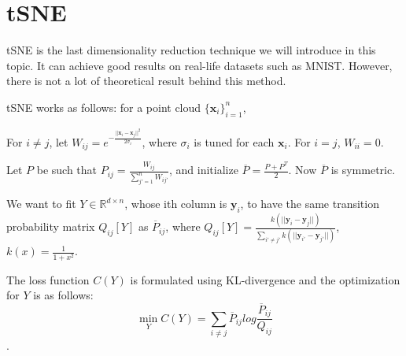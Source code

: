 \documentclass[11pt]{article}
\theoremstyle{definition}
\begin{document}
\section{tSNE}
tSNE is the last dimensionality reduction technique we will introduce in this topic. It can achieve good results on real-life datasets such as MNIST. However, there is not a lot of theoretical result behind this method.

tSNE works as follows: for a point cloud $\{\mathbf{x}_i\}_{i=1}^n$,
\begin{steps}
\item For $i \neq j$, let $W_{ij} = e^{-\frac{||\boldsymbol{x}_i-\boldsymbol{x}_j||^2}{2\sigma_i}}$, where $\sigma_i$ is tuned for each $\boldsymbol{x}_i$. For $i = j$, $W_{ii} = 0$.

Let $P$ be such that $P_{ij} = \frac{W_{ij}}{\sum_{j'=1}^{n}W_{ij'}}$, and initialize $\overline{P} = \frac{P+P^T}{2}$. Now $\overline{P}$ is symmetric.

\item We want to fit $Y \in \mathbb{R}^{d \times n}$, whose ith column is $\boldsymbol{y}_i$, to have the same transition probability matrix $Q_{ij}[Y]$ as $\overline{P}_{ij}$, where $Q_{ij}[Y] = \frac{k(||\boldsymbol{y}_i - \boldsymbol{y}_j||)}{\sum_{i'\neq j'} k(||\boldsymbol{y}_{i'} - \boldsymbol{y}_{j'}||)}$, $k(x) = \frac{1}{1+x^2}$.

The loss function $C(Y)$ is formulated using KL-divergence and the optimization for $Y$ is as follows:
\[\min_{Y}C(Y) = \sum_{i \neq j}\overline{P}_{ij}log\frac{\overline{P}_{ij}}{Q_{ij}}\].
\end{steps}
\end{document}
